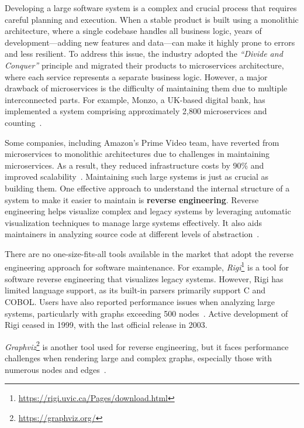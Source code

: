 Developing a large software system is a complex and crucial process that requires careful planning and execution. When a stable product is built using a monolithic architecture, where a single codebase handles all business logic, years of development—adding new features and data—can make it highly prone to errors and less resilient. To address this issue, the industry adopted the \textit{``Divide and Conquer''} principle and migrated their products to microservices architecture, where each service represents a separate business logic. However, a major drawback of microservices is the difficulty of maintaining them due to multiple interconnected parts. For example, Monzo, a UK-based digital bank, has implemented a system comprising approximately 2,800 microservices and counting~\citep{monzoMicroservices}.

Some companies, including Amazon's Prime Video team, have reverted from microservices to monolithic architectures due to challenges in maintaining microservices. As a result, they reduced infrastructure costs by 90\% and improved scalability~\citep{anderson2023microservices}. Maintaining such large systems is just as crucial as building them. One effective approach to understand the internal structure of a system to make it easier to maintain is \textbf{reverse engineering}. Reverse engineering helps visualize complex and legacy systems by leveraging automatic visualization techniques to manage large systems effectively. It also aids maintainers in analyzing source code at different levels of abstraction~\citep{SVInSoftwareMaintenanceRainer}.

There are no one-size-fits-all tools available in the market that adopt the reverse engineering approach for software maintenance. For example, \textit{Rigi}\footnote{\url{https://rigi.uvic.ca/Pages/download.html}} is a tool for software reverse engineering that visualizes legacy systems. However, Rigi has limited language support, as its built-in parsers primarily support C and COBOL. Users have also reported performance issues when analyzing large systems, particularly with graphs exceeding 500 nodes~\citep{Koschke2002}. Active development of Rigi ceased in 1999, with the last official release in 2003. 

\textit{Graphviz}\footnote{\url{https://graphviz.org/}} is another tool used for reverse engineering, but it faces performance challenges when rendering large and complex graphs, especially those with numerous nodes and edges~\citep{graphviz_large_graphs}.

